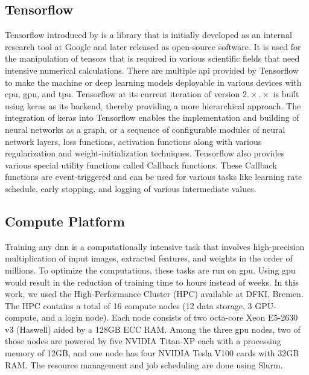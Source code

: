     \subsection{Tensorflow}
    Tensorflow introduced by \citet{Abadi2016} is a library that is initially developed as an internal research tool at Google and later released as open-source software. It is used for the manipulation of tensors that is required in various scientific fields that need intensive numerical calculations. There are multiple \acrshort{api} provided by Tensorflow to make the machine or deep learning models deployable in various devices with \acrshort{cpu}, \acrshort{gpu}, and \acrshort{tpu}. Tensorflow at its current iteration of version $2.\times.\times$ is built using keras \cite{chollet2015keras} as its backend, thereby providing a more hierarchical approach. The integration of keras into Tensorflow enables the implementation and building of neural networks as a graph, or a sequence of configurable modules of neural network layers, loss functions, activation functions along with various regularization and weight-initialization techniques. Tensorflow also provides various special utility functions called Callback functions. These Callback functions are event-triggered and can be used for various tasks like learning rate schedule, early stopping, and logging of various intermediate values.
    
    \subsection{Compute Platform}
    Training any \acrshort{dnn} is a computationally intensive task that involves high-precision multiplication of input images, extracted features, and weights in the order of millions. To optimize the computations, these tasks are run on \acrshort{gpu}. Using \acrshort{gpu} would result in the reduction of training time to hours instead of weeks. In this work, we used the High-Performance Cluster (HPC) available at DFKI, Bremen. The HPC contains a total of 16 compute nodes (12 data storage, 3 GPU-compute, and a login node). Each node consists of two octa-core Xeon E5-2630 v3 (Haswell) aided by a 128GB ECC RAM. Among the three \acrshort{gpu} nodes, two of those nodes are powered by five NVIDIA Titan-XP each with a processing memory of 12GB, and one node has four NVIDIA Tesla V100 cards with 32GB RAM. The resource management and job scheduling are done using Slurm.
    
